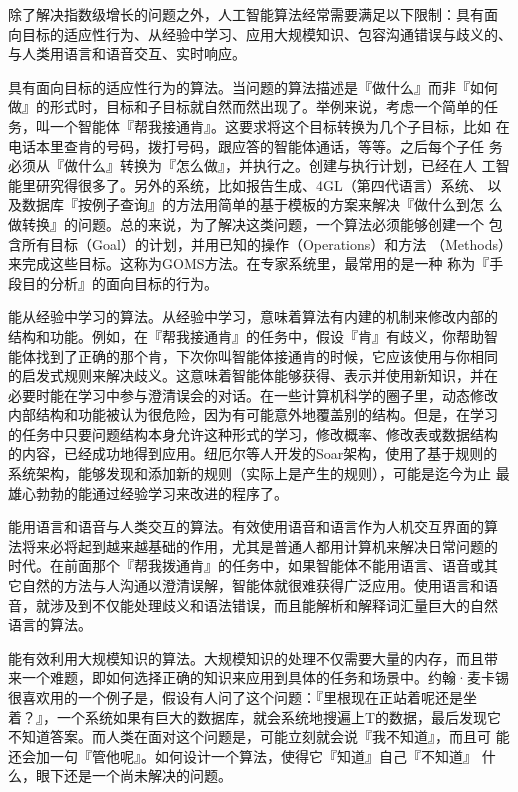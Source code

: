 \documentclass[12pt,a4paper]{article}
\begin{document}
除了解决指数级增长的问题之外，人工智能算法经常需要满足以下限制：具有面
向目标的适应性行为、从经验中学习、应用大规模知识、包容沟通错误与歧义的、
与人类用语言和语音交互、实时响应。

具有面向目标的适应性行为的算法。当问题的算法描述是『做什么』而非『如何
做』的形式时，目标和子目标就自然而然出现了。举例来说，考虑一个简单的任
务，叫一个智能体『帮我接通肯』。这要求将这个目标转换为几个子目标，比如
在电话本里查肯的号码，拨打号码，跟应答的智能体通话，等等。之后每个子任
务必须从『做什么』转换为『怎么做』，并执行之。创建与执行计划，已经在人
工智能里研究得很多了。另外的系统，比如报告生成、4GL（第四代语言）系统、
以及数据库『按例子查询』的方法用简单的基于模板的方案来解决『做什么到怎
么做转换』的问题。总的来说，为了解决这类问题，一个算法必须能够创建一个
包含所有目标（Goal）的计划，并用已知的操作（Operations）和方法
（Methods）来完成这些目标。这称为GOMS方法。在专家系统里，最常用的是一种
称为『手段目的分析』的面向目标的行为。

能从经验中学习的算法。从经验中学习，意味着算法有内建的机制来修改内部的
结构和功能。例如，在『帮我接通肯』的任务中，假设『肯』有歧义，你帮助智
能体找到了正确的那个肯，下次你叫智能体接通肯的时候，它应该使用与你相同
的启发式规则来解决歧义。这意味着智能体能够获得、表示并使用新知识，并在
必要时能在学习中参与澄清误会的对话。在一些计算机科学的圈子里，动态修改
内部结构和功能被认为很危险，因为有可能意外地覆盖别的结构。但是，在学习
的任务中只要问题结构本身允许这种形式的学习，修改概率、修改表或数据结构
的内容，已经成功地得到应用。纽厄尔等人开发的Soar架构，使用了基于规则的
系统架构，能够发现和添加新的规则（实际上是产生的规则），可能是迄今为止
最雄心勃勃的能通过经验学习来改进的程序了。

能用语言和语音与人类交互的算法。有效使用语音和语言作为人机交互界面的算
法将来必将起到越来越基础的作用，尤其是普通人都用计算机来解决日常问题的
时代。在前面那个『帮我拨通肯』的任务中，如果智能体不能用语言、语音或其
它自然的方法与人沟通以澄清误解，智能体就很难获得广泛应用。使用语言和语
音，就涉及到不仅能处理歧义和语法错误，而且能解析和解释词汇量巨大的自然
语言的算法。

能有效利用大规模知识的算法。大规模知识的处理不仅需要大量的内存，而且带
来一个难题，即如何选择正确的知识来应用到具体的任务和场景中。约翰·麦卡锡
很喜欢用的一个例子是，假设有人问了这个问题：『里根现在正站着呢还是坐
着？』，一个系统如果有巨大的数据库，就会系统地搜遍上T的数据，最后发现它
不知道答案。而人类在面对这个问题是，可能立刻就会说『我不知道』，而且可
能还会加一句『管他呢』。如何设计一个算法，使得它『知道』自己『不知道』
什么，眼下还是一个尚未解决的问题。
\end{document}
